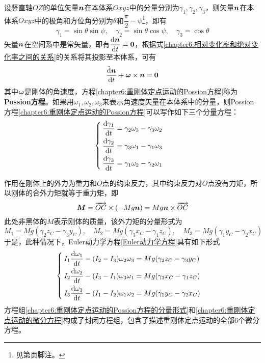设竖直轴$OZ$的单位矢量$\boldsymbol{n}$在本体系$Oxyz$中的分量分别为$\gamma_1,\gamma_2,\gamma_3$，则矢量$\boldsymbol{n}$在本体系$Oxyz$中的极角和方位角分别为$\theta$和$\dfrac\pi2-\psi$\footnote{见第\pageref{chapter6:footnote-Euler角和球坐标系之间的关系}页脚注。}，即有
\begin{equation}
	\gamma_1=\sin\theta\sin\psi,\quad \gamma_2=\sin\theta\cos\psi,\quad \gamma_3=\cos\theta
	\label{chapter6:重刚体定点运动中Z方向固定矢量分量与Euler角的关系}
\end{equation}
矢量$\boldsymbol{n}$在空间系中是常矢量，即有$\dfrac{\mathrm{d} \boldsymbol{n}}{\mathrm{d} t}=\boldsymbol{0}$，根据式\eqref{chapter6:相对变化率和绝对变化率之间的关系}的关系将其投影至本体系，可有
\begin{equation}
	\frac{\tilde{\mathrm{d}} \boldsymbol{n}}{\mathrm{d} t}+\boldsymbol{\omega}\times \boldsymbol{n}=\boldsymbol{0}
	\label{chapter6:重刚体定点运动的Possion方程}
\end{equation}
其中$\boldsymbol{\omega}$是刚体的角速度，方程\eqref{chapter6:重刚体定点运动的Possion方程}称为{\bf Possion方程}。如果用$\omega_1,\omega_2,\omega_3$来表示角速度矢量在本体系中的分量，则Possion方程\eqref{chapter6:重刚体定点运动的Possion方程}可以写作如下三个分量方程：
\begin{equation}
\begin{cases}
	\dfrac{\mathrm{d} \gamma_1}{\mathrm{d} t}=\gamma_2\omega_3-\gamma_3\omega_2 \\[1.5ex]
	\dfrac{\mathrm{d} \gamma_2}{\mathrm{d} t}=\gamma_3\omega_1-\gamma_1\omega_3 \\[1.5ex]
	\dfrac{\mathrm{d} \gamma_3}{\mathrm{d} t}=\gamma_1\omega_2-\gamma_2\omega_1
\end{cases}
\label{chapter6:重刚体定点运动的Possion方程的分量形式}
\end{equation}

作用在刚体上的外力为重力和$O$点的约束反力，其中约束反力对$O$点没有力矩，所以刚体的合外力矩就等于重力矩，即
\begin{equation}
	\boldsymbol{M} = \overrightarrow{OC}\times (-Mg\boldsymbol{n}) = Mg\boldsymbol{n}\times \overrightarrow{OC}
	\label{chapter6:重刚体定点运动的外力矩}
\end{equation}
此处非黑体的$M$表示刚体的质量，该外力矩的分量形式为
\begin{equation}
	M_1 = Mg(\gamma_2z_C-\gamma_3y_C),\quad M_2 = Mg(\gamma_3x_C-\gamma_1z_C),\quad M_3 = Mg(\gamma_1y_C-\gamma_2x_C)
	\label{chapter6:重刚体定点运动的外力矩-分量形式}
\end{equation}
于是，此种情况下，Euler动力学方程\eqref{Euler动力学方程}具有如下形式
\begin{equation}
\begin{cases}
	I_1 \dfrac{\mathrm{d} \omega_1}{\mathrm{d} t} - (I_2-I_3)\omega_2 \omega_3 = Mg(\gamma_2z_C-\gamma_3y_C) \\[1.5ex]
	I_2 \dfrac{\mathrm{d} \omega_2}{\mathrm{d} t} - (I_3-I_1)\omega_3 \omega_1 = Mg(\gamma_3x_C-\gamma_1z_C) \\[1.5ex]
	I_3 \dfrac{\mathrm{d} \omega_3}{\mathrm{d} t} - (I_1-I_2)\omega_1 \omega_2 = Mg(\gamma_1y_C-\gamma_2x_C)
\end{cases}
\label{chapter6:重刚体定点运动的微分方程}
\end{equation}
方程组\eqref{chapter6:重刚体定点运动的Possion方程的分量形式}和\eqref{chapter6:重刚体定点运动的微分方程}构成了封闭方程组，包含了描述重刚体定点运动的全部6个微分方程。

